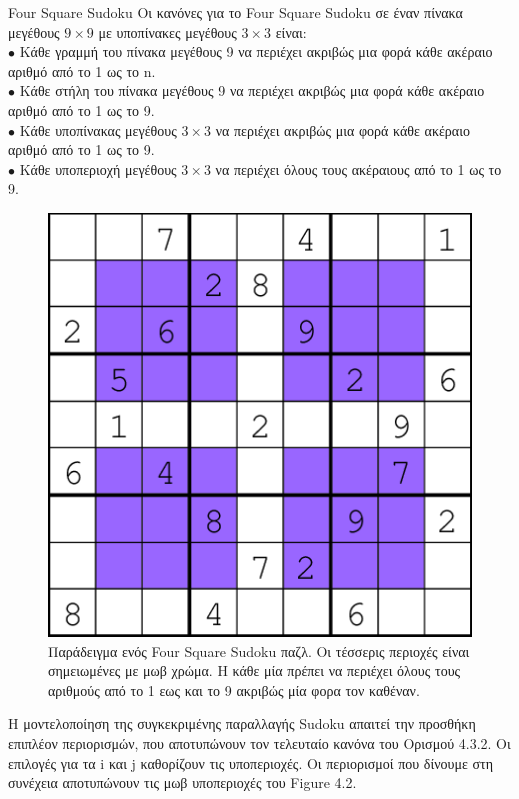 \documentclass[oneside,12pt]{book}
\theoremstyle{definition}
\begin{document}
\begin{mytheorem}{Four Square Sudoku}{}
	Οι κανόνες για το Four Square Sudoku σε έναν πίνακα μεγέθους \(9 \times 9\) με υποπίνακες μεγέθους \(3 \times 3\) είναι: \\
	\(\bullet\) Κάθε γραμμή του πίνακα μεγέθους 9 να περιέχει ακριβώς μια φορά κάθε ακέραιο αριθμό από το 1 ως το n. \\
	\(\bullet\) Κάθε στήλη του πίνακα μεγέθους 9 να περιέχει ακριβώς μια φορά κάθε ακέραιο αριθμό από το 1 ως το 9. \\
	\(\bullet\) Κάθε υποπίνακας μεγέθους \(3 \times 3\) να περιέχει ακριβώς μια φορά κάθε ακέραιο αριθμό από το 1 ως το 9. \\
	\(\bullet\) Κάθε υποπεριοχή μεγέθους
\(3 \times 3\) να περιέχει όλους τους ακέραιους από το 1 ως το 9. \\
\end{mytheorem}

\begin{figure}[h]
	\centering
	\includegraphics[scale=0.7]{Figures/An-example-Four-Square-Sudoku-puzzle.png}
	\caption{Παράδειγμα ενός Four Square Sudoku παζλ. Οι τέσσερις περιοχές είναι σημειωμένες με μωβ χρώμα. Η κάθε μία πρέπει να περιέχει όλους τους αριθμούς από το 1 εως και το 9 ακριβώς μία φορα τον καθέναν.}
\end{figure}

Η μοντελοποίηση της συγκεκριμένης παραλλαγής Sudoku απαιτεί την προσθήκη επιπλέον περιορισμών, που αποτυπώνουν τον τελευταίο κανόνα του Ορισμού 4.3.2. Οι επιλογές για τα i και j καθορίζουν τις υποπεριοχές. Οι περιορισμοί που δίνουμε στη συνέχεια αποτυπώνουν τις μωβ υποπεριοχές του Figure 4.2.\\
\end{document}
